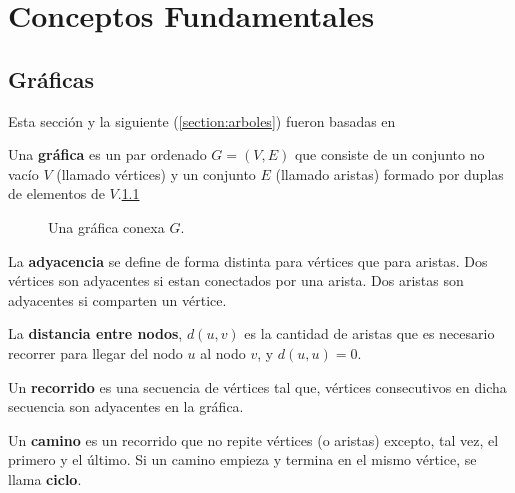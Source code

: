 \chapter{Conceptos Fundamentales}

\section{Gr\'aficas}

Esta secci\'on y la siguiente (\ref{section:arboles}) fueron basadas en \cite{open}

\begin{definition}[Gr\'afica]
Una \textbf{gr\'afica} es un par ordenado $G=(V, E)$ que consiste de un conjunto no vac\'io $V$ (llamado v\'ertices) y un conjunto $E$ (llamado aristas) formado por duplas de elementos de $V$.\ref{fig:graph}
\end{definition}

\begin{figure}
\centering
  \caption{Una gr\'afica conexa $G$.}\label{fig:graph}
\end{figure}

\begin{definition}[Adyacencia]
La \textbf{adyacencia} se define de forma distinta para v\'ertices que para aristas. Dos v\'ertices son adyacentes si estan conectados por una arista. Dos aristas son adyacentes si comparten un v\'ertice.
\end{definition}

\begin{definition}
La \textbf{distancia entre nodos}, $d(u,v)$ es la cantidad de aristas que es necesario recorrer para llegar del nodo $u$ al nodo $v$, y $d(u,u)=0$.
\end{definition}

\begin{definition}[Recorrido]
Un \textbf{recorrido} es una secuencia de v\'ertices tal que, v\'ertices consecutivos en dicha secuencia son adyacentes en la gr\'afica.
\end{definition}

\begin{definition}[Camino]
Un \textbf{camino} es un recorrido que no repite v\'ertices (o aristas) excepto, tal vez, el primero y el \'ultimo. Si un camino empieza y termina en el mismo v\'ertice, se llama \textbf{ciclo}.
\end{definition}


